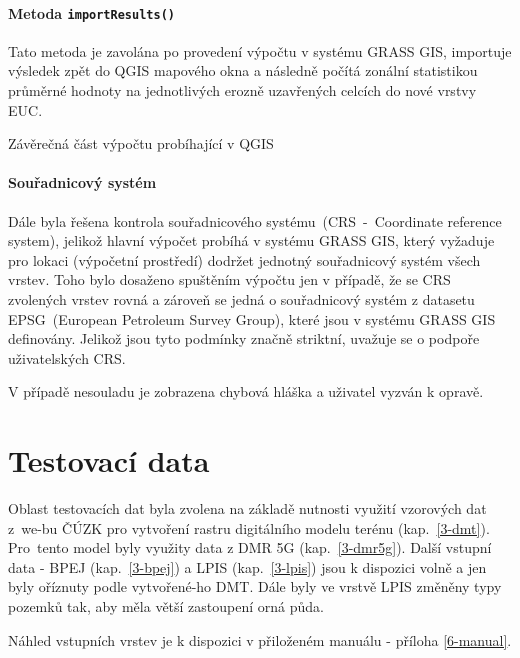 \paragraph{Metoda \texttt{importResults()}} Tato metoda je zavolána po
provedení výpočtu v systému GRASS GIS, importuje výsledek zpět do QGIS mapového
okna a následně počítá zonální statistikou průměrné hodnoty na
jednotlivých erozně uzavřených celcích do nové vrstvy EUC.
\begin{algorithm}
\caption{Závěrečná část výpočtu probíhající v QGIS}
\label{alg:onAddKFactor}
    \begin{algorithmic}[1] 
   
    \end{algorithmic}
\end{algorithm}

\paragraph{Souřadnicový systém} Dále byla řešena kontrola
souřadnicového systému~(CRS~-~Coordinate reference system), jelikož
hlavní výpočet probíhá v systému GRASS GIS, který vyžaduje pro lokaci
(výpočetní prostředí) dodržet jednotný souřadnicový systém všech
vrstev. Toho bylo dosaženo spuštěním výpočtu jen v případě, že se CRS
zvolených vrstev rovná a zároveň se jedná o souřadnicový systém z datasetu
EPSG~(European Petroleum Survey Group), které jsou v systému GRASS GIS
definovány. Jelikož jsou tyto podmínky značně striktní, uvažuje se o 
podpoře uživatelských CRS.

V případě nesouladu je zobrazena chybová hláška a uživatel vyzván k
opravě.

\section{Testovací data} Oblast testovacích dat byla zvolena na
základě nutnosti využití vzorových dat z~we-bu ČÚZK\cite{cuzk} pro vytvoření rastru
digitálního modelu terénu (kap.~\ref{3-dmt}). Pro~tento model byly využity data
z DMR 5G (kap.~\ref{3-dmr5g}). Další vstupní data - BPEJ (kap.~\ref{3-bpej}) a LPIS (kap.~\ref{3-lpis}) jsou k
dispozici volně a jen byly oříznuty podle vytvořené-ho DMT. Dále byly
ve vrstvě LPIS změněny typy pozemků tak, aby měla větší zastoupení
orná půda.

Náhled vstupních vrstev je k dispozici v přiloženém manuálu - příloha \ref{6-manual}.
